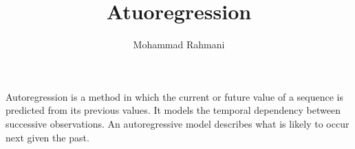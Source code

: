 \documentclass[a4paper]{article}
\title{Atuoregression}
\date{}
\author{Mohammad Rahmani}
\begin{document}
   \maketitle

   Autoregression is a method in which the current or future value of a sequence is predicted from its previous values. It models the temporal dependency between successive observations. An autoregressive model describes what is likely to occur next given the past.

   
   
\end{document}

